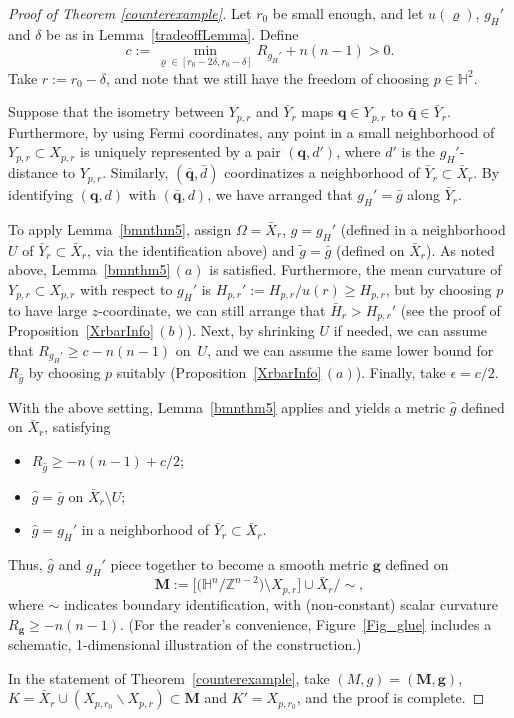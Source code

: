 \documentclass[10pt,a4paper]{amsart}
\numberwithin{equation}{section}
\def\H{\mathbb{H}}
\def\Z{\mathbb{Z}}
\def\bs{\boldsymbol}
\def\setdiff{\backslash}
\begin{document}
\begin{proof}[Proof of Theorem \ref{counterexample}]
Let $r_0$ be small enough, and let $u(\varrho)$, $g_H'$ and $\delta$ be as in
Lemma~\ref{tradeoffLemma}. Define
\[
	c:= \min_{\varrho\in [r_0 - 2\delta, r_0 - \delta]} R_{g_H'} + n(n-1) >0.
\]	
Take $r := r_0 - \delta$, and note that we still have the freedom of
choosing $p\in \H^2$.

Suppose that the isometry between $Y_{p,r}$ and $\bar Y_r$
maps $\bs{q}\in Y_{p,r}$ to $\bar{\bs{q}}\in \bar Y_r$.
Furthermore, by using Fermi coordinates, any point in a small neighborhood of
$Y_{p,r}\subset X_{p,r}$ is uniquely represented by a pair
$(\bs{q}, d')$, where $d'$ is the $g_{H}'$-distance to $Y_{p,r}$.
Similarly, $(\bar{\bs{q}}, \bar d)$
coordinatizes a neighborhood of $\bar Y_r\subset \bar X_r$.
By identifying $(\bs{q}, d)$ with $(\bar {\bs q}, d)$, we have arranged that
$g_H' = \bar g$ along $\bar Y_{r}$.

To apply Lemma~\ref{bmnthm5}, assign $\Omega = \bar X_r$, $g = g_{H}'$ (defined
in a neighborhood $U$ of $\bar Y_r\subset\bar X_r$, via the identification above) and $\tilde g = \bar g$ (defined
on $\bar X_r$).
As noted above, Lemma~\ref{bmnthm5}\,$(a)$ is satisfied.
Furthermore, the mean curvature of $Y_{p,r}\subset X_{p,r}$ with respect to
$g_{H}'$ is $H_{p,r}':=H_{p,r}/u(r)\ge H_{p,r}$, but by choosing $p$ to have
large $z$-coordinate, we can still
arrange that $\bar H_r > H_{p,r}'$ (see the proof of Proposition~\ref{XrbarInfo}\,$(b)$).
Next, by shrinking $U$ if needed, we can assume that $R_{g_H'} \ge c - n(n-1)$ on~$U$, and we can assume the same lower bound for $R_{\bar g}$ by choosing $p$ suitably (Proposition~\ref{XrbarInfo}\,$(a)$).
Finally, take $\epsilon = c/2$.

With the above setting, Lemma~\ref{bmnthm5} applies and yields a metric
$\hat g$ defined on $\bar X_r$, satisfying
\begin{itemize}\itemsep=0pt
 	\item $R_{\hat g}\ge -n(n-1)+ c/2$;
	\item $\hat g = \bar g$ on $\bar X_r \setminus U$;
	\item $\hat g = g_H'$ in a neighborhood of $\bar Y_r\subset \bar X_r$.
\end{itemize}
Thus, $\hat g$ and $g_H'$ piece together to become a smooth metric
$\bs{g}$ defined  on
\[
	 \bs{M}:=\bigl[\big(\H^n/\Z^{n-2}\big)\setminus X_{p,r}\bigr] \cup \bar X_r/{\sim},
\]
where $\sim$
indicates boundary identification,
with (non-constant) scalar curvature
$R_{\bs{g}}\ge -n(n-1)$.
(For the reader's convenience, Figure~\ref{Fig_glue} includes a schematic,
1-dimensional illustration of the construction.)

In the statement of Theorem~\ref{counterexample},
take $(M,g) = (\bs{M}, \bs{g})$, $K = \bar X_r \cup (X_{p,r_0}\setdiff X_{p,r})\subset \bs{M}$
and $K' = X_{p,r_0}$, and the proof is complete.
\end{proof}
\end{document}
